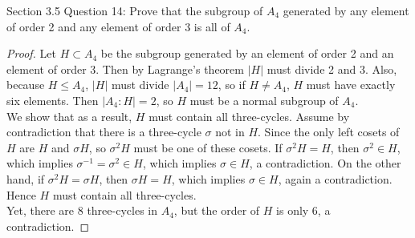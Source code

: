 Section 3.5 Question 14:
Prove that the subgroup of $A_4$ generated by any element of order 2 and
any element of order 3 is all of $A_4$.
\begin{proof}
  Let $H\subset A_4$ be the subgroup generated by an element of order 2 and
  an element of order 3. Then by Lagrange's theorem $|H|$ must divide 2 and
  3. Also, because $H\leq A_4$, $|H|$ must divide $|A_4|=12$, so if $H\neq
  A_4$, $H$ must have exactly six elements. Then $|A_4:H|=2$, so $H$ must
  be a normal subgroup of $A_4$. \\

  We show that as a result, $H$ must contain all three-cycles. Assume by
  contradiction that there is a three-cycle $\sigma$ not in $H$. Since the
  only left cosets of $H$ are $H$ and $\sigma H$, so $\sigma^2H$ must be
  one of these cosets. If $\sigma^2H=H$, then $\sigma^2\in H$, which
  implies $\sigma^{-1}=\sigma^2\in H$, which implies $\sigma\in H$, a
  contradiction. On the other hand, if $\sigma^2H=\sigma H$, then $\sigma
  H=H$, which implies $\sigma\in H$, again a contradiction. Hence $H$ must
  contain all three-cycles. \\

  Yet, there are 8 three-cycles in $A_4$, but the order of $H$ is only 6, a
  contradiction.
\end{proof}
